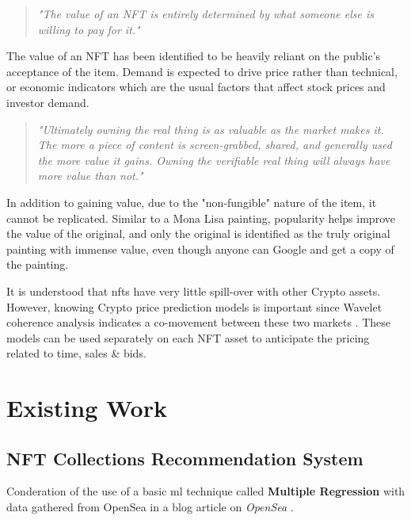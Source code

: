 \documentclass[conference]{IEEEtran}
\begin{document}
\begin{quote} 
\centering 
\emph{"The value of an NFT is entirely determined by what someone else is willing to pay for it."}
\\
\raggedleft
\autocite{conti_what_2021}
\end{quote}

The value of an NFT has been identified to be heavily reliant on the public's acceptance of the item. Demand is expected to drive price rather than technical, or economic indicators which are the usual factors that affect stock prices and investor demand.

\begin{quote} 
\centering 
\emph{"Ultimately owning the real thing is as valuable as the market makes it. The more a piece of content is screen-grabbed, shared, and generally used the more value it gains. Owning the verifiable real thing will always have more value than not."}
\\
\raggedleft
\autocite{noauthor_erc-721_nodate}
\end{quote}

In addition to gaining value, due to the "non-fungible" nature of the item, it cannot be replicated. Similar to a Mona Lisa painting, popularity helps improve the value of the original, and only the original is identified as the truly original painting with immense value, even though anyone can Google and get a copy of the painting.

It is understood that \gls{nft}s have very little spill-over with other Crypto assets. However, knowing Crypto price prediction models is important since Wavelet coherence analysis indicates a co-movement between these two markets \autocite{dowling_is_2021}.
These models can be used separately on each NFT asset to anticipate the pricing related to time, sales \& bids.


\section{Existing Work}

\subsection{NFT Collections Recommendation System}

Conderation of the use of a basic \gls{ml} technique called \textbf{Multiple Regression} with data gathered from OpenSea in a blog article on \emph{OpenSea} \autocite{noauthor_what_2020}.
\end{document}
